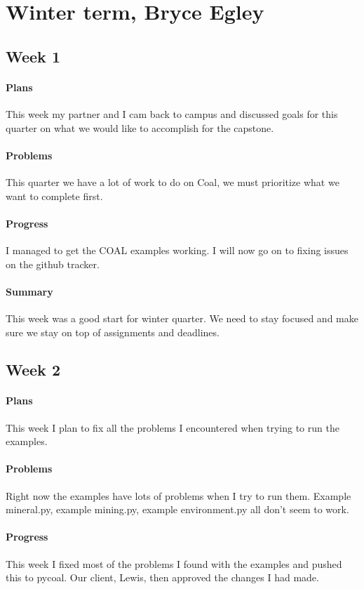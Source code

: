 \documentclass{article}
\begin{document}
\section{Winter term, Bryce Egley}
\subsection{Week 1}
\paragraph{Plans}
This week my partner and I cam back to campus and discussed goals for this quarter on what we would like to accomplish for the capstone. 
\paragraph{Problems}
This quarter we have a lot of work to do on Coal, we must prioritize what we want to complete first.  
\paragraph{Progress}
I managed to get the COAL examples working. I will now go on to fixing issues on the github tracker. 
\paragraph{Summary}
This week was a good start for winter quarter. We need to stay focused and make sure we stay on top of assignments and deadlines. 
\subsection{Week 2}
\paragraph{Plans}
 This week I plan to fix all the problems I encountered when trying to run the examples. 
\paragraph{Problems}
Right now the examples have lots of problems when I try to run them. Example mineral.py, example mining.py, example environment.py all don't seem to work. 
\paragraph{Progress}
This week I fixed most of the problems I found with the examples and pushed this to pycoal. Our client, Lewis, then approved the changes I had made. 
\end{document}
